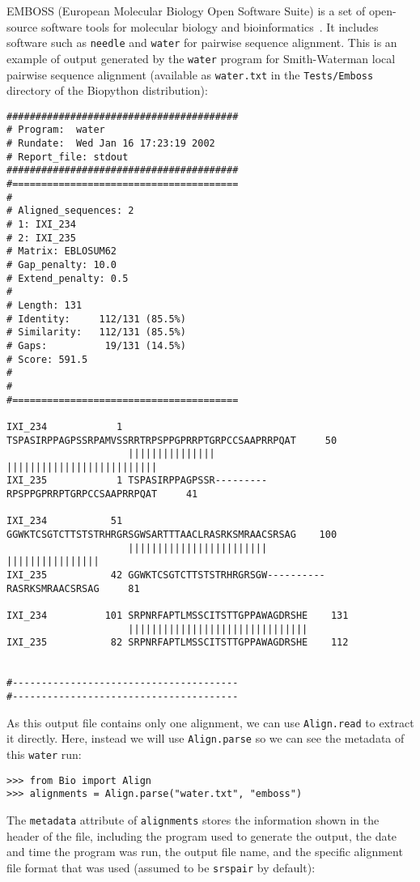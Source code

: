 EMBOSS (European Molecular Biology Open Software Suite) is a set of open-source software tools for molecular biology and bioinformatics~\cite{rice2000}. It includes software such as \verb|needle| and \verb|water| for pairwise sequence alignment. This is an example of output generated by the \verb|water| program for Smith-Waterman local pairwise sequence alignment (available as \verb|water.txt| in the \verb|Tests/Emboss| directory of the Biopython distribution):
\begin{verbatim}
########################################
# Program:  water
# Rundate:  Wed Jan 16 17:23:19 2002
# Report_file: stdout
########################################
#=======================================
#
# Aligned_sequences: 2
# 1: IXI_234
# 2: IXI_235
# Matrix: EBLOSUM62
# Gap_penalty: 10.0
# Extend_penalty: 0.5
#
# Length: 131
# Identity:     112/131 (85.5%)
# Similarity:   112/131 (85.5%)
# Gaps:          19/131 (14.5%)
# Score: 591.5
#
#
#=======================================

IXI_234            1 TSPASIRPPAGPSSRPAMVSSRRTRPSPPGPRRPTGRPCCSAAPRRPQAT     50
                     |||||||||||||||         ||||||||||||||||||||||||||
IXI_235            1 TSPASIRPPAGPSSR---------RPSPPGPRRPTGRPCCSAAPRRPQAT     41

IXI_234           51 GGWKTCSGTCTTSTSTRHRGRSGWSARTTTAACLRASRKSMRAACSRSAG    100
                     ||||||||||||||||||||||||          ||||||||||||||||
IXI_235           42 GGWKTCSGTCTTSTSTRHRGRSGW----------RASRKSMRAACSRSAG     81

IXI_234          101 SRPNRFAPTLMSSCITSTTGPPAWAGDRSHE    131
                     |||||||||||||||||||||||||||||||
IXI_235           82 SRPNRFAPTLMSSCITSTTGPPAWAGDRSHE    112


#---------------------------------------
#---------------------------------------       
\end{verbatim}
As this output file contains only one alignment, we can use \verb|Align.read| to extract it directly. Here, instead we will use \verb|Align.parse| so we can see the metadata of this \verb|water| run:
\begin{verbatim}
>>> from Bio import Align
>>> alignments = Align.parse("water.txt", "emboss")
\end{verbatim}
The \verb|metadata| attribute of \verb|alignments| stores the information shown in the header of the file, including the program used to generate the output, the date and time the program was run, the output file name, and the specific alignment file format that was used (assumed to be \verb|srspair| by default):
